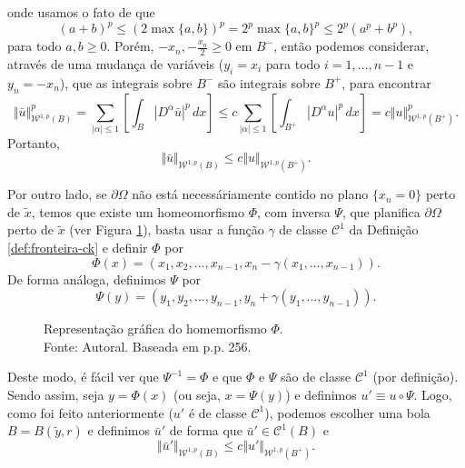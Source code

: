 \documentclass[a4paper, 11pt]{book}
\theoremstyle{definition}
\newcommand{\cC}{\mathcal{C}}
\newcommand{\cW}{\mathcal{W}}
\begin{document}
\begin{prf}
\[    \]
    onde usamos o fato de que
    \[
        (a + b)^p \leqslant (2 \max\{a,b\})^p = 2^p \max\{a,b\}^p \leqslant 2^p (a^p + b^p),
    \]
    para todo $a,b \geqslant 0$. Porém, $-x_n, -\tfrac{x_n}{2} \geqslant 0$ em $B^-$, então podemos considerar, através de uma mudança de variáveis ($y_i = x_i$ para todo $i = 1,\dots,n-1$ e $y_n = -x_n$), que as integrais sobre $B^-$ são integrais sobre $B^+$, para encontrar
    \[
        \Vert \bar u \Vert_{\cW^{1,p}(B)}^p = \sum_{|\alpha| \leqslant 1} \left[\int_B |D^\alpha \bar u| ^p \,dx\right] \leqslant c\sum_{|\alpha| \leqslant 1} \left[ \int_{B^+}|D^\alpha u|^p \,dx \right] = c \Vert u \Vert_{\cW^{1,p}(B^+)}^p.
    \]
    Portanto,
    \[
        \Vert \bar u \Vert_{\cW^{1,p}(B)} \leqslant c \Vert u \Vert_{\cW^{1,p}(B^+)}.
    \]

    Por outro lado, se $\partial\Omega$ não está necessáriamente contido no plano $\{x_n = 0\}$ perto de $\tilde x$, temos que existe um homeomorfismo $\Phi$, com inversa $\Psi$, que planifica $\partial \Omega$ perto de $\tilde x$ (ver Figura \ref{fig:homeomorfismo}),  basta usar a função $\gamma$ de classe $\cC^1$ da Definição \ref{def:fronteira-ck} e definir $\Phi$ por
    \begin{equation} \label{eq:Phi}
        \Phi(x) = (x_1,x_2,...,x_{n-1}, x_n - \gamma(x_1,\dots,x_{n-1})).
    \end{equation}
    De forma análoga, definimos $\Psi$ por
    \begin{equation} \label{eq:Psi}
        \Psi(y) = (y_1,y_2,\dots,y_{n-1},y_n + \gamma(y_1,\dots,y_{n-1})).
    \end{equation}
    \begin{figure}
        \centering
        
        \caption{Representação gráfica do homemorfismo $\Phi$.\\Fonte: Autoral. Baseada em \cite{evans-pde} p.p. 256.}
        \label{fig:homeomorfismo}
    \end{figure}
    \!\!Deste modo, é fácil ver que $\Psi^{-1} = \Phi$ e que $\Phi$ e $\Psi$ são de classe $\cC^1$ (por definição). Sendo assim, seja $y = \Phi(x)$ (ou seja, $x = \Psi(y)$) e definimos $u' \equiv u \circ \Psi$. Logo, como foi feito anteriormente ($u'$ é de classe $\cC^1$), podemos escolher uma bola $B = B(\tilde y, r)$ e definimos $\bar u'$ de forma que $\bar u' \in \cC^1(B)$ e
    \begin{equation} \label{eq:BBBB}
        \Vert \bar u' \Vert_{\cW^{1,p}(B)} \leqslant c \Vert u' \Vert_{\cW^{1,p}(B^+)}.
    \end{equation}

\end{prf}
\end{document}
